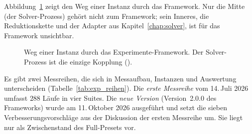 Abbildung~\ref{abb:exp_pipeline} zeigt den Weg einer Instanz durch das Framework. Nur die Mitte (der Solver-Prozess) gehört nicht zum Framework; sein Inneres, die Reduktionskette und der Adapter aus Kapitel~\ref{chap:solver}, ist für das Framework unsichtbar.

\begin{figure}[!ht]
	\centering
	\caption{Weg einer Instanz durch das Experimente-Framework. Der Solver-Prozess ist die einzige Kopplung ().}
	\label{abb:exp_pipeline}
\end{figure}

Es gibt zwei Messreihen, die sich in Messaufbau, Instanzen und Auswertung unterscheiden (Tabelle~\ref{tab:exp_reihen}). Die \emph{erste Messreihe} vom 14.\,Juli 2026 umfasst $288$ Läufe in vier Suites. Die \emph{neue Version} (Version~2.0.0 des Frameworks) wurde am 11.\,Oktober 2026 ausgeführt und setzt die sieben Verbesserungsvorschläge aus der Diskussion der ersten Messreihe um. Sie liegt nur als Zwischenstand des Full-Presets vor.

